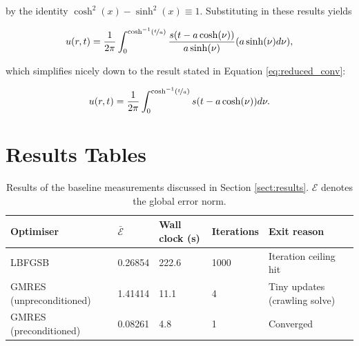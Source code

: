 \documentclass[final-report]{report-template}
\begin{document}
by the identity $\cosh^2(x) - \sinh^2(x) \equiv 1$. Substituting in these results yields

\begin{equation}
    u(r, t) = \frac{1}{2\pi} \int^{\cosh^{-1}(\nicefrac{t}{a})}_0 \frac{s(t-a\cosh(\nu))}{a\sinh(\nu)} (a\sinh(\nu)d\nu),
\end{equation}

which simplifies nicely down to the result stated in Equation \eqref{eq:reduced_conv}:

\begin{equation}
    u(r, t) = \frac{1}{2\pi} \int^{\cosh^{-1}(\nicefrac{t}{a})}_0 s(t-a\cosh(\nu)) d\nu.
\end{equation}

\section{Results Tables}
\label{app:results}

\begin{table}[!htp]
    \centering    
    \begin{tabular}{lllll}
        \toprule
        Optimiser & $\bar{\mathcal{E}}$ & Wall clock (s) & Iterations & Exit reason \\
        \midrule
        LBFGSB & 0.26854 & 222.6 & 1000 & Iteration ceiling hit \\
        GMRES (unpreconditioned) & 1.41414 & 11.1 & 4 & Tiny updates (crawling solve)\\
        GMRES (preconditioned) & 0.08261 & 4.8 & 1 & Converged \\ 
        \bottomrule
    \end{tabular}
    \caption{Results of the baseline measurements discussed in Section \ref{sect:results}. $\mathcal{E}$ denotes the global error norm.}
    \label{tab:baseline}
\end{table}
\end{document}
